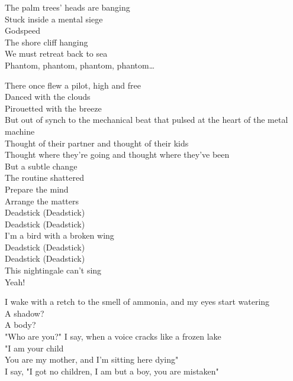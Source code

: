The palm trees' heads are banging\\
Stuck inside a mental siege\\
Godspeed\\
The shore cliff hanging\\
We must retreat back to sea\\

Phantom, phantom, phantom, phantom…\\




There once flew a pilot, high and free\\
Danced with the clouds\\
Pirouetted with the breeze\\
But out of synch to the mechanical beat that pulsed at the heart of the metal machine\\
Thought of their partner and thought of their kids\\
Thought where they're going and thought where they've been\\
But a subtle change\\
The routine shattered\\
Prepare the mind\\
Arrange the matters\\

Deadstick (Deadstick)\\
Deadstick (Deadstick)\\
I'm a bird with a broken wing\\
Deadstick (Deadstick)\\
Deadstick (Deadstick)\\
This nightingale can't sing\\
Yeah!\\


I wake with a retch to the smell of ammonia, and my eyes start watering\\
A shadow?\\
A body?\\
"Who are you?" I say, when a voice cracks like a frozen lake\\
"I am your child\\
You are my mother, and I'm sitting here dying"\\
I say, "I got no children, I am but a boy, you are mistaken"\\

